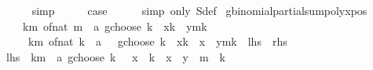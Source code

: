 \begin{isabellebody}
\ \ \ \ \isamarkupfalse%
\ simp\isanewline
\ \ \isamarkupfalse%
\ \isamarkupfalse%
\ {\isacharquery}{\kern0pt}case\isanewline
\ \ \ \ \isamarkupfalse%
\ {\isacharparenleft}{\kern0pt}simp\ only{\isacharcolon}{\kern0pt}\ S{\isacharunderscore}{\kern0pt}def{\isacharparenright}{\kern0pt}\isanewline
{}\isamarkupfalse%
%
\endisatagproof
{\isafoldproof}%
%
\isadelimproof
\isanewline
%
\endisadelimproof
\isanewline
{}\isamarkupfalse%
\ gbinomial{\isacharunderscore}{\kern0pt}partial{\isacharunderscore}{\kern0pt}sum{\isacharunderscore}{\kern0pt}poly{\isacharunderscore}{\kern0pt}xpos{\isacharcolon}{\kern0pt}\isanewline
\ \ \ \ {\isachardoublequoteopen}{\isacharparenleft}{\kern0pt}{\isasymSum}k{\isasymle}m{\isachardot}{\kern0pt}\ {\isacharparenleft}{\kern0pt}of{\isacharunderscore}{\kern0pt}nat\ m\ {\isacharplus}{\kern0pt}\ a\ gchoose\ k{\isacharparenright}{\kern0pt}\ {\isacharasterisk}{\kern0pt}\ x{\isacharcircum}{\kern0pt}k\ {\isacharasterisk}{\kern0pt}\ y{\isacharcircum}{\kern0pt}{\isacharparenleft}{\kern0pt}m{\isacharminus}{\kern0pt}k{\isacharparenright}{\kern0pt}{\isacharparenright}{\kern0pt}\ {\isacharequal}{\kern0pt}\isanewline
\ \ \ \ \ {\isacharparenleft}{\kern0pt}{\isasymSum}k{\isasymle}m{\isachardot}{\kern0pt}\ {\isacharparenleft}{\kern0pt}of{\isacharunderscore}{\kern0pt}nat\ k\ {\isacharplus}{\kern0pt}\ a\ {\isacharminus}{\kern0pt}\ {}\ gchoose\ k{\isacharparenright}{\kern0pt}\ {\isacharasterisk}{\kern0pt}\ x{\isacharcircum}{\kern0pt}k\ {\isacharasterisk}{\kern0pt}\ {\isacharparenleft}{\kern0pt}x\ {\isacharplus}{\kern0pt}\ y{\isacharparenright}{\kern0pt}{\isacharcircum}{\kern0pt}{\isacharparenleft}{\kern0pt}m{\isacharminus}{\kern0pt}k{\isacharparenright}{\kern0pt}{\isacharparenright}{\kern0pt}{\isachardoublequoteclose}\ {\isacharparenleft}{\kern0pt}\ {\isachardoublequoteopen}{\isacharquery}{\kern0pt}lhs\ {\isacharequal}{\kern0pt}\ {\isacharquery}{\kern0pt}rhs{\isachardoublequoteclose}{\isacharparenright}{\kern0pt}\isanewline
%
\isadelimproof
%
\endisadelimproof
%
\isatagproof
{}\isamarkupfalse%
\ {\isacharminus}{\kern0pt}\isanewline
\ \ \isamarkupfalse%
\ {\isachardoublequoteopen}{\isacharquery}{\kern0pt}lhs\ {\isacharequal}{\kern0pt}\ {\isacharparenleft}{\kern0pt}{\isasymSum}k{\isasymle}m{\isachardot}{\kern0pt}\ {\isacharparenleft}{\kern0pt}{\isacharminus}{\kern0pt}\ a\ gchoose\ k{\isacharparenright}{\kern0pt}\ {\isacharasterisk}{\kern0pt}\ {\isacharparenleft}{\kern0pt}{\isacharminus}{\kern0pt}\ x{\isacharparenright}{\kern0pt}\ {\isacharcircum}{\kern0pt}\ k\ {\isacharasterisk}{\kern0pt}\ {\isacharparenleft}{\kern0pt}x\ {\isacharplus}{\kern0pt}\ y{\isacharparenright}{\kern0pt}\ {\isacharcircum}{\kern0pt}\ {\isacharparenleft}{\kern0pt}m\ {\isacharminus}{\kern0pt}\ k{\isacharparenright}{\kern0pt}{\isacharparenright}{\kern0pt}{\isachardoublequoteclose}\isanewline

\end{isabellebody}
